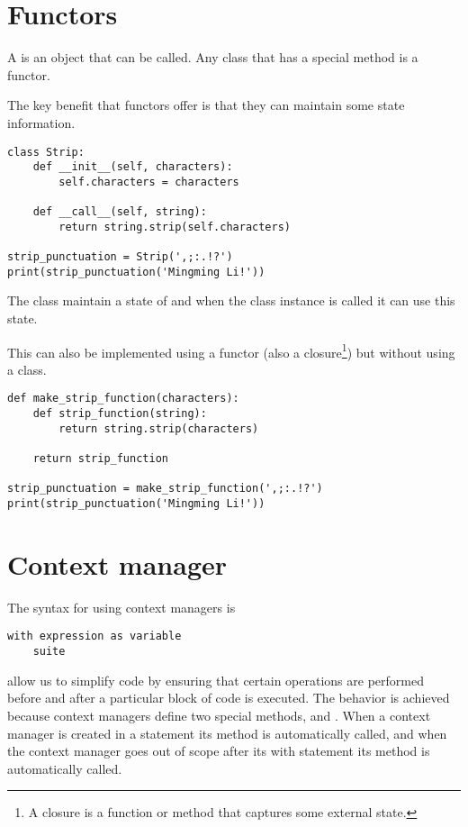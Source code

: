\section{Functors}
\label{sec:functors}

A  is an object that can be called.
Any class that has a  special method is a functor.

The key benefit that functors offer is that they can maintain some state information.
\begin{lstlisting}
class Strip:
    def __init__(self, characters):
        self.characters = characters

    def __call__(self, string):
        return string.strip(self.characters)
  
strip_punctuation = Strip(',;:.!?')
print(strip_punctuation('Mingming Li!'))
\end{lstlisting}

The  class maintain a state of  and when the class instance is called it can use this state.

This can also be implemented using a functor (also a closure\footnote{A closure is a function or method that captures some external state.}) but without using a class.

\begin{lstlisting}
def make_strip_function(characters):
    def strip_function(string):
        return string.strip(characters)

    return strip_function  

strip_punctuation = make_strip_function(',;:.!?')
print(strip_punctuation('Mingming Li!')) 
\end{lstlisting}


\section{Context manager}
\label{sec:context-manager}

The syntax for using context managers is
\begin{lstlisting}
with expression as variable
    suite
\end{lstlisting}


 allow us to simplify code by ensuring that certain operations are performed before and after a particular block of code is executed.
The behavior is achieved because context managers define two special methods,  and .
When a context manager is created in a  statement its  method is automatically called, and when the context manager goes out of scope after its with statement its  method is automatically called.

